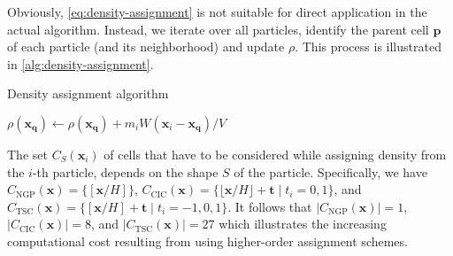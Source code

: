 Obviously, \autoref{eq:density-assignment} is not suitable for direct application in the actual algorithm.
Instead, we iterate over all particles, identify the parent cell $\mathbf{p}$ of each particle (and its neighborhood) and update $\rho$.
This process is illustrated in \autoref{alg:density-assignment}.
\begin{algorithm}
    \caption{Density assignment algorithm}\label{alg:density-assignment}
    \begin{algorithmic}
        \State $\rho(\mathbf{x}_\mathbf{q}) \gets \rho(\mathbf{x}_\mathbf{q}) + m_i W(\mathbf{x}_i - \mathbf{x}_\mathbf{q}) / V$
        \EndFor
        \EndFor
    \end{algorithmic}
\end{algorithm}
The set $C_S(\mathbf{x}_i)$ of cells that have to be considered while assigning density from the $i$-th particle, depends on the shape $S$ of the particle.
Specifically, we have $C_\mathrm{NGP}(\mathbf{x}) = \{[\mathbf{x} / H]\}$, $C_\mathrm{CIC}(\mathbf{x}) = \{\lfloor \mathbf{x}/H \rfloor + \mathbf{t} \;|\; t_i =0,1\}$, and $C_\mathrm{TSC}(\mathbf{x}) = \{[\mathbf{x} / H] + \mathbf{t} \;|\; t_i = -1, 0, 1\}$.
It follows that  $|C_\mathrm{NGP}(\mathbf{x})| = 1$, $|C_\mathrm{CIC}(\mathbf{x})| = 8$, and $|C_\mathrm{TSC}(\mathbf{x})| = 27$ which illustrates the increasing computational cost resulting from using higher-order assignment schemes.

